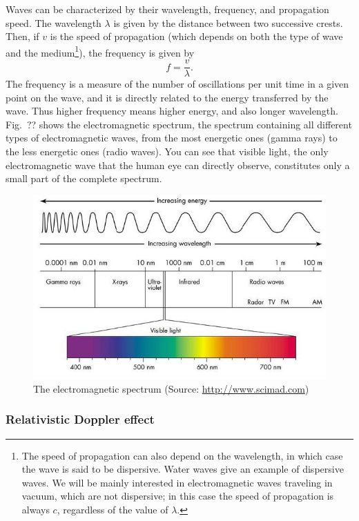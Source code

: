 Waves can be characterized by their wavelength, frequency, and propagation speed. The wavelength $\lambda$ is given by the distance between two successive crests. Then, if $v$ is the speed of propagation (which depends on both the type of wave and the medium\footnote{The speed of propagation can also depend on the wavelength, in which case the wave is said to be dispersive. Water waves give an example of dispersive waves. We will be mainly interested in electromagnetic waves traveling in vacuum, which are not dispersive; in this case the speed of propagation is always $c$, regardless of the value of $\lambda$.}), the frequency is given by
\begin{equation}
f=\frac{v}{\lambda}.
\end{equation}
The frequency is a measure of the number of oscillations per unit time in a given point on the wave, and it is directly related to the energy transferred by the wave. Thus higher frequency means higher energy, and also longer wavelength. Fig.\ ?? shows the electromagnetic spectrum, the spectrum containing all different types of electromagnetic waves, from the most energetic ones (gamma rays) to the less energetic ones (radio waves). You can see that visible light, the only electromagnetic wave that the human eye can directly observe, constitutes only a small part of the complete spectrum.
\begin{figure}[ht]
\begin{center}
\includegraphics[scale=2]{Draw/lec4_6.png}
\end{center}
\caption{The electromagnetic spectrum (Source: \url{http://www.scimad.com})}
\label{fig:lec4_6}
\end{figure}

\subsubsection{Relativistic Doppler effect}

